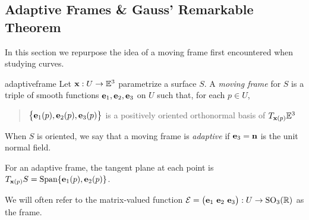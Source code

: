 \clearpage




\subsection{Adaptive Frames \& Gauss' Remarkable Theorem}

In this section we repurpose the idea of a moving frame first encountered when studying curves. 

\begin{defn}{}{adaptiveframe}
	Let ${\mathbf{x}}:U\to\mathbb{E}^3$ parametrize a surface $S$. A \emph{moving frame} for $S$ is a triple of smooth functions ${\mathbf{e}}_1,{\mathbf{e}}_2,{\mathbf{e}}_3$ on $U$ such that, for each $p\in U$,
	\begin{quote}
		$\bigl\{{\mathbf{e}}_1(p),{\mathbf{e}}_2(p),{\mathbf{e}}_3(p)\bigr\}$ is a positively oriented orthonormal basis of $T_{{\mathbf{x}}(p)}\mathbb{E}^3$
	\end{quote}
	When $S$ is oriented, we say that a moving frame is \emph{adaptive} if ${\mathbf{e}}_3={\mathbf{n}}$ is the unit normal field.
\end{defn}

For an adaptive frame, the tangent plane at each point is $T_{{\mathbf{x}}(p)}S=\operatorname{Span}\{{\mathbf{e}}_1(p),{\mathbf{e}}_2(p)\}$.\par
We will often refer to the matrix-valued function $\cE=\bigl(\ve_1\ \ve_2\ \ve_3\bigr):U\to\rSO_3(\R)$ as the frame.


